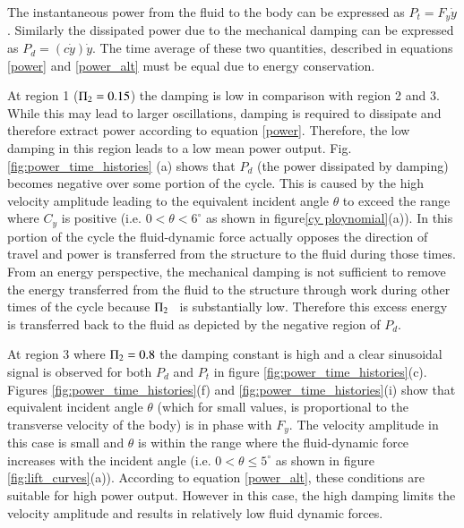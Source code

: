 

The instantaneous power from the fluid to the body can be expressed as $P_t=F_y\dot{y}$. Similarly the dissipated power due to the mechanical damping can be expressed as $P_d=(c\dot{y})\dot{y}$. The time average of these two quantities, described in equations \ref{power} and \ref{power_alt} must be equal due to energy conservation.
 
 

At region 1 ($\Pi_2=0.15$) the damping is low in comparison with region 2 and 3. While this may lead to larger oscillations, damping is required to dissipate and therefore extract power according to equation \ref{power}. Therefore, the low damping in this region leads to a low mean power output. Fig.\ref{fig:power_time_histories} (a) shows that $P_d$ (the power dissipated by damping) becomes negative over some portion of the cycle. This is caused by the high velocity amplitude leading to the equivalent incident angle $\theta$ to exceed the range where $C_y$ is positive (i.e. $0<\theta<6^\circ$ as shown in figure\ref{cy ploynomial}(a)). In this portion of the cycle the fluid-dynamic force actually opposes the direction of travel and power is transferred from the structure to the fluid during those times. From an energy perspective, the mechanical damping is not sufficient to remove the energy transferred from the fluid to the structure through work during other times of the cycle because $\Pi_2$ \ is substantially low. Therefore this excess energy is transferred back to the fluid as depicted by the negative region of $P_d$.

\vspace{1mm} 
At region 3 where $\Pi_2=0.8$ the damping constant is high and a clear sinusoidal signal is observed for both $P_d$ and $P_t$ in figure \ref{fig:power_time_histories}(c). Figures \ref{fig:power_time_histories}(f) and  \ref{fig:power_time_histories}(i) show that equivalent incident angle $\theta$ (which for small values, is proportional to the transverse velocity of the body) is in phase with $F_y$.  The velocity amplitude in this case is small and $\theta$ is within the range where the fluid-dynamic force increases with the incident angle (i.e. $0<\theta \leq 5^\circ$ as shown in figure \ref{fig:lift_curves}(a)). According to equation \ref{power_alt}, these conditions are suitable for high power output. However in this case, the high damping limits the velocity amplitude and results in relatively low fluid dynamic forces.
  
